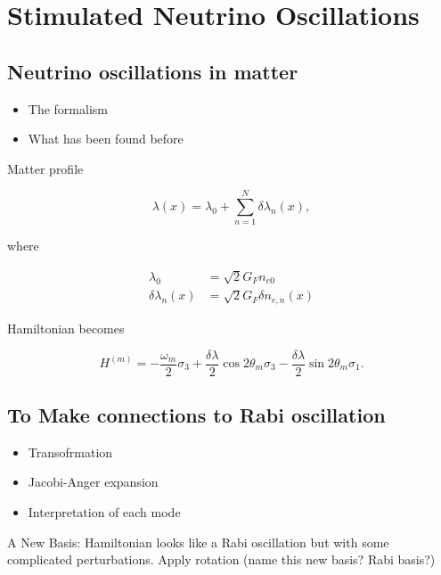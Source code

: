 \documentclass[%
preprint,
 amsmath,amssymb,
 aps,
]{revtex4-1}
\begin{document}
\section{\label{stimulated}Stimulated Neutrino Oscillations}



\subsection{Neutrino oscillations in matter}

\begin{itemize}
    \item The formalism
    \item What has been found before
\end{itemize}


    Matter profile

\begin{equation}
    \lambda(x) = \lambda_0 + \sum_{n=1}^{N} \delta \lambda_n (x),
\end{equation}

where

\begin{align}
    \lambda_0 &= \sqrt{2}G_F n_{e0} \\
    \delta \lambda_n(x) &= \sqrt{2}G_F \delta n_{e,n}(x)
\end{align}


Hamiltonian becomes

\begin{equation}
    H^{(m)} = - \frac{\omega_m}{2} \sigma_3 + \frac{\delta \lambda}{2} \cos 2\theta_m \sigma_3 - \frac{\delta \lambda}{2} \sin 2 \theta_m \sigma_1.
\end{equation}


\subsection{To Make connections to Rabi oscillation}

\begin{itemize}
    \item Transofrmation
    \item Jacobi-Anger expansion
    \item Interpretation of each mode
\end{itemize}


A New Basis: Hamiltonian looks like a Rabi oscillation but with some complicated perturbations.
    Apply rotation (name this new basis? Rabi basis?)
\end{document}
